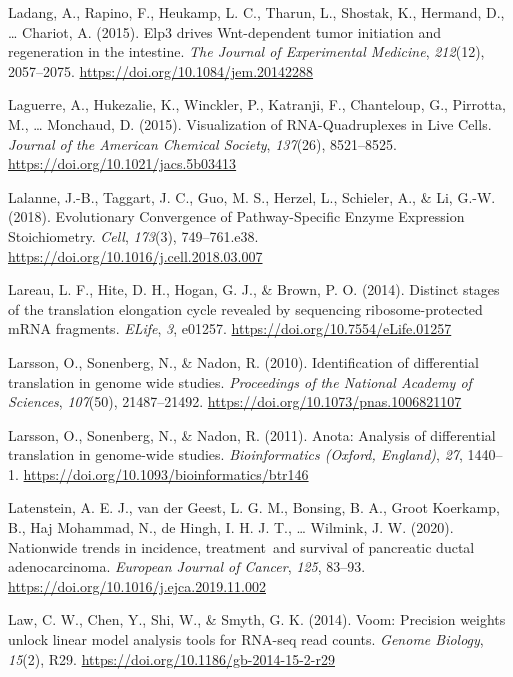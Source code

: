 \documentclass[12pt,openany]{book}
\begin{document}
\hypertarget{ref-Ladang2015}{}
Ladang, A., Rapino, F., Heukamp, L. C., Tharun, L., Shostak, K.,
Hermand, D., \ldots{} Chariot, A. (2015). Elp3 drives Wnt-dependent
tumor initiation and regeneration in the intestine. \emph{The Journal of
Experimental Medicine}, \emph{212}(12), 2057--2075.
\url{https://doi.org/10.1084/jem.20142288}

\hypertarget{ref-Laguerre2015}{}
Laguerre, A., Hukezalie, K., Winckler, P., Katranji, F., Chanteloup, G.,
Pirrotta, M., \ldots{} Monchaud, D. (2015). Visualization of
RNA-Quadruplexes in Live Cells. \emph{Journal of the American Chemical
Society}, \emph{137}(26), 8521--8525.
\url{https://doi.org/10.1021/jacs.5b03413}

\hypertarget{ref-Lalanne2018}{}
Lalanne, J.-B., Taggart, J. C., Guo, M. S., Herzel, L., Schieler, A., \&
Li, G.-W. (2018). Evolutionary Convergence of Pathway-Specific Enzyme
Expression Stoichiometry. \emph{Cell}, \emph{173}(3), 749--761.e38.
\url{https://doi.org/10.1016/j.cell.2018.03.007}

\hypertarget{ref-Lareau2014}{}
Lareau, L. F., Hite, D. H., Hogan, G. J., \& Brown, P. O. (2014).
Distinct stages of the translation elongation cycle revealed by
sequencing ribosome-protected mRNA fragments. \emph{ELife}, \emph{3},
e01257. \url{https://doi.org/10.7554/eLife.01257}

\hypertarget{ref-Larsson2010}{}
Larsson, O., Sonenberg, N., \& Nadon, R. (2010). Identification of
differential translation in genome wide studies. \emph{Proceedings of
the National Academy of Sciences}, \emph{107}(50), 21487--21492.
\url{https://doi.org/10.1073/pnas.1006821107}

\hypertarget{ref-Larsson2011}{}
Larsson, O., Sonenberg, N., \& Nadon, R. (2011). Anota: Analysis of
differential translation in genome-wide studies. \emph{Bioinformatics
(Oxford, England)}, \emph{27}, 1440--1.
\url{https://doi.org/10.1093/bioinformatics/btr146}

\hypertarget{ref-Latenstein2020}{}
Latenstein, A. E. J., van der Geest, L. G. M., Bonsing, B. A., Groot
Koerkamp, B., Haj Mohammad, N., de Hingh, I. H. J. T., \ldots{} Wilmink,
J. W. (2020). Nationwide trends in incidence, treatment~and survival of
pancreatic ductal adenocarcinoma. \emph{European Journal of Cancer},
\emph{125}, 83--93. \url{https://doi.org/10.1016/j.ejca.2019.11.002}

\hypertarget{ref-Law2014}{}
Law, C. W., Chen, Y., Shi, W., \& Smyth, G. K. (2014). Voom: Precision
weights unlock linear model analysis tools for RNA-seq read counts.
\emph{Genome Biology}, \emph{15}(2), R29.
\url{https://doi.org/10.1186/gb-2014-15-2-r29}
\end{document}
